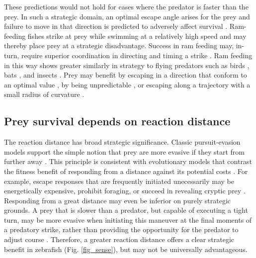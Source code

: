 \documentclass[]{rsos}%
\begin{document}
These predictions would not hold for cases where the predator is faster than the prey.
In such a strategic domain, an optimal escape angle arises for the prey and failure to move in that direction is predicted to adversely affect survival \cite{Soto:2015cj,Weihs:1984tb}. 
Ram-feeding fishes strike at prey while swimming at a relatively high speed and may thereby place prey at a strategic disadvantage.
Success in ram feeding may, in-turn, require superior coordination in directing and timing a strike \cite{Wainwright:2001ufa}.
Ram feeding in this way shows greater similarly in strategy to flying predators such as birds \cite{Shifferman:2004fs}, bats \cite{Ghose:2006dk}, and insects \cite{Combes:2012et}.
Prey may benefit by escaping in a direction that conform to an optimal value \cite{Weihs:1984tb}, by being unpredictable \cite{Humphries:1970hy}, or escaping along a trajectory with a small radius of curvature \cite{Howland:1974ud,Corcoran:2016ed}.

\subsection{Prey survival depends on reaction distance} 

The reaction distance has broad strategic significance.
Classic pursuit-evasion models support the simple notion that prey are more evasive if they start from further away \cite{Soto:2015cj,Isaacs:1965uz,Weihs:1984tb}.
This principle is consistent with evolutionary models that contrast the fitness benefit of responding from a distance against its potential costs \cite{Cooper:2015vf,Ydenberg:1986tm}.
For example, escape responses that are frequently initiated unecessarily may be energetically expensive, prohibit foraging, or succeed in revealing cryptic prey \cite{Broom:2005gq}.
Responding from a great distance may even be inferior on purely strategic grounds.
A prey that is slower than a predator, but capable of executing a tight turn, may be more evasive when initiating this maneuver at the final moments of a predatory strike, rather than providing the opportunity for the predator to adjust course \cite{Howland:1974ud}.
Therefore, a greater reaction distance offers a clear strategic benefit in zebrafish (Fig. \ref{fig_sense}), but may not be universally advantageous.
\end{document}
